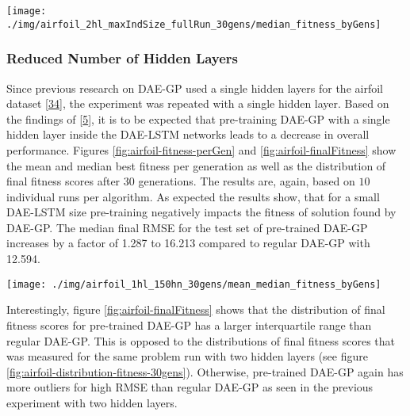 \documentclass[
  11pt,
]{article}
\let\origfigure\figure
\let\endorigfigure\endfigure
\renewenvironment{figure}[1][2] {
    \expandafter\origfigure\expandafter[H]
} {
    \endorigfigure
}
\begin{document}
\begin{figure}[c]

{\centering \texttt{[image: ./img/airfoil\_2hl\_maxIndSize\_fullRun\_30gens/median\_fitness\_byGens]} 

}

\caption{Median Best Fitness over 30 Generations - Airfoil - Dynamic adjustment of regular DAE-GP}\label{fig:airfoil-maxIndSize-fitness}
\end{figure}

\hypertarget{reduced-number-of-hidden-layers}{%
\subsubsection{Reduced Number of Hidden Layers}\label{reduced-number-of-hidden-layers}}

Since previous research on DAE-GP used a single hidden layers for the airfoil dataset {[}\protect\hyperlink{ref-dae-gp_2022_symreg}{34}{]}, the experiment was repeated with a single hidden layer.
Based on the findings of {[}\protect\hyperlink{ref-pmlr-v5-erhan09a}{5}{]}, it is to be expected that pre-training DAE-GP with a single hidden layer inside the DAE-LSTM networks leads to a decrease in overall performance.
Figures \ref{fig:airfoil-fitness-perGen} and \ref{fig:airfoil-finalFitness} show the mean and median best fitness per generation as well as the distribution of final fitness scores after 30 generations.
The results are, again, based on \(10\) individual runs per algorithm.
As expected the results show, that for a small DAE-LSTM size pre-training negatively impacts the fitness of solution found by DAE-GP.
The median final RMSE for the test set of pre-trained DAE-GP increases by a factor of 1.287 to 16.213 compared to regular DAE-GP with 12.594.

\begin{figure}[c]

{\centering \texttt{[image: ./img/airfoil\_1hl\_150hn\_30gens/mean\_median\_fitness\_byGens]} 

}

\caption{Fitness over 30 Generations - Airfoil - Single Hidden Layer}\label{fig:airfoil-fitness-perGen}
\end{figure}

Interestingly, figure \ref{fig:airfoil-finalFitness} shows that the distribution of final fitness scores for pre-trained DAE-GP has a larger interquartile range than regular DAE-GP.
This is opposed to the distributions of final fitness scores that was measured for the same problem run with two hidden layers (see figure \ref{fig:airfoil-distribution-fitness-30gens}).
Otherwise, pre-trained DAE-GP again has more outliers for high RMSE than regular DAE-GP as seen in the previous experiment with two hidden layers.
\end{document}
